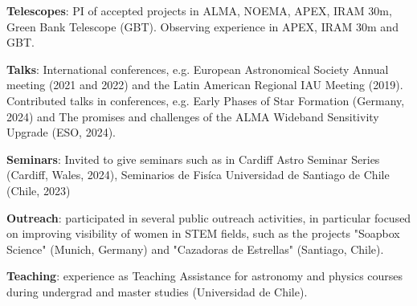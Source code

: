 \paragraphstyle
\vspace{8pt}

\begin{cvitems}
    \item \textbf{Telescopes}: PI of accepted projects in ALMA, NOEMA, APEX, IRAM 30m, Green Bank Telescope (GBT). Observing experience in APEX, IRAM 30m and GBT. 
    \item \textbf{Talks}: International conferences, e.g. European Astronomical Society Annual meeting (2021 and 2022) and the Latin American Regional IAU Meeting (2019). Contributed talks in conferences, e.g. Early Phases of Star Formation (Germany, 2024) and The promises and challenges of the ALMA Wideband Sensitivity Upgrade (ESO, 2024).
    \item \textbf{Seminars}: Invited to give seminars such as in Cardiff Astro Seminar Series (Cardiff, Wales, 2024), Seminarios de Fisíca Universidad de Santiago de Chile (Chile, 2023)
    \item \textbf{Outreach}: participated in several public outreach activities, in particular focused on improving visibility of women in STEM fields, such as the projects "Soapbox Science" (Munich, Germany) and "Cazadoras de Estrellas" (Santiago, Chile). 
    \item \textbf{Teaching}: experience as Teaching Assistance for astronomy and physics courses during undergrad and master studies (Universidad de Chile).
\end{cvitems}

	
	



